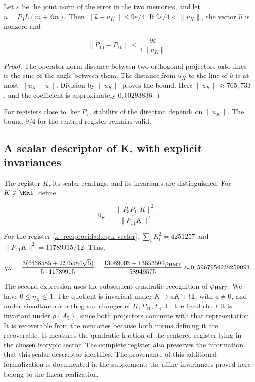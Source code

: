 Let \(\varepsilon\) be the joint norm of the error in the two memories, and let \(\widehat u=P_3L(m+\delta m)\). Then \(\|\widehat u-u_K\|\le9\varepsilon/4\). If \(9\varepsilon/4<\|u_K\|\), the vector \(\widehat u\) is nonzero and



\begin{equation}
\boxed{
\|\widehat P_{10}-P_{10}\|
\le\frac{9\varepsilon}{4\|u_K\|}.
}
\label{x_reciprocidad:nuc11:eq:15}
\end{equation}



\begin{proof}
The operator-norm distance between two orthogonal projectors onto lines is the sine of the angle between them. The distance from \(u_K\) to the line of \(\widehat u\) is at most \(\|u_K-\widehat u\|\). Division by \(\|u_K\|\) proves the bound. Here \(\|u_K\|\approx765{,}733\), and the coefficient is approximately \(0{,}00293836\).
\end{proof}
For registers close to \(\ker P_3\), stability of the direction depends on \(\|u_K\|\). The bound \(9/4\) for the centred register remains valid.

\subsection{A scalar descriptor of K, with explicit invariances}

The register \(K\), its scalar readings, and its invariants are distinguished. For \(K\notin\RR\mathbf1\), define



\begin{equation}
\eta_K=\frac{\|P_3P_{11}K\|^2}{\|P_{11}K\|^2}.
\label{x_reciprocidad:nuc11:eq:16}
\end{equation}



For the register \eqref{x_reciprocidad:eq:k-vector}, \(\sum_iK_i^2=4251257\) and \(\|P_{11}K\|^2=11789915/12\). Thus,



\begin{equation}
\eta_K=
\frac{3(6638585+2275584\sqrt5)}{5\cdot11789915}
=\frac{13089003+13653504\varphi_{\rm HMT}}{58949575}
\approx0,5967954228259091.
\label{x_reciprocidad:nuc11:eq:17}
\end{equation}



The second expression uses the subsequent quadratic recognition
of \(\varphi_{\rm HMT}\).
We have \(0\le\eta_K\le1\).
The quotient is invariant under
\(K\mapsto aK+b\mathbf1\), with \(a\ne0\), and under simultaneous
orthogonal changes of \(K,P_{11},P_3\).
In the fixed chart it is invariant under \(\rho(A_5)\), since both
projectors commute with that representation.
It is recoverable from the memories because both norms defining
it are recoverable.
It measures the quadratic fraction of the centered register lying in the
chosen isotypic sector.
The complete register also preserves the information that this
scalar descriptor identifies.
The provenance of this additional formalization is documented in
the supplement; the affine invariances proved here belong
to the linear realization.

